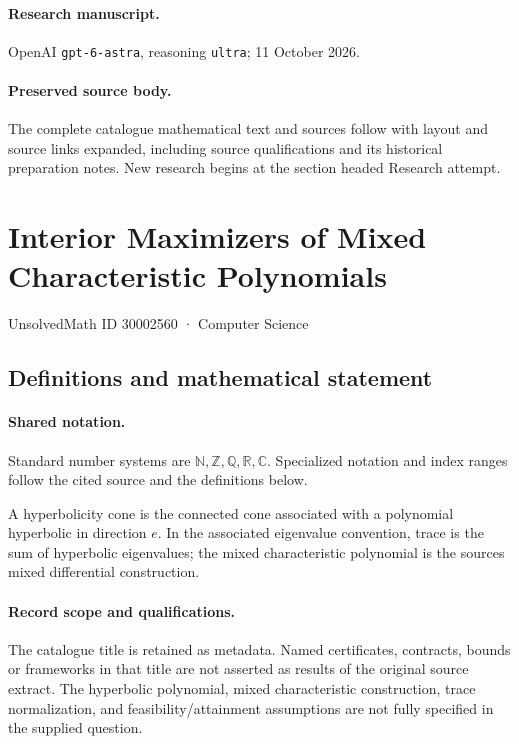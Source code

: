 \documentclass[11pt]{article}
\begin{document}
\paragraph{Research manuscript.} OpenAI \texttt{gpt-6-astra}, reasoning \texttt{ultra}; 11 October 2026.
\paragraph{Preserved source body.} The complete catalogue mathematical text and sources follow with layout and source links expanded, including source qualifications and its historical preparation notes. New research begins at the section headed Research attempt.

\section{Interior Maximizers of Mixed Characteristic Polynomials}\label{30002560}
{\small UnsolvedMath ID 30002560 · Computer Science}
\subsection{Definitions and mathematical statement}

\paragraph{Shared notation.}Standard number systems are $\mathbb N,\mathbb Z,\mathbb Q,\mathbb R,\mathbb C$. Specialized notation and index ranges follow the cited source and the definitions below.


A hyperbolicity cone is the connected cone associated with a polynomial hyperbolic in direction $e$. In the associated eigenvalue convention, trace is the sum of hyperbolic eigenvalues; the mixed characteristic polynomial is the source\textquotesingle s mixed differential construction.
\paragraph{Record scope and qualifications.}
The catalogue title is retained as metadata. Named certificates, contracts, bounds or frameworks in that title are not asserted as results of the original source extract.
The hyperbolic polynomial, mixed characteristic construction, trace normalization, and feasibility/attainment assumptions are not fully specified in the supplied question.
\end{document}
